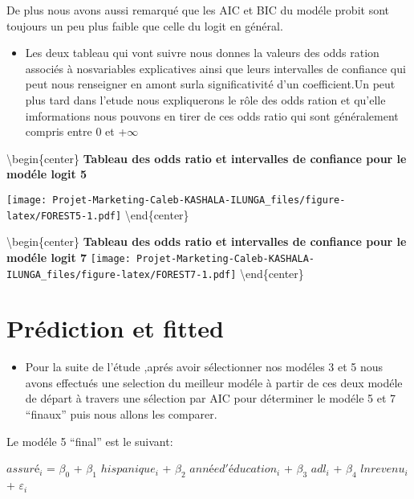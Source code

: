 \documentclass[
  14pt,
  french,
]{article}
\providecommand{\tightlist}{%
  \setlength{\itemsep}{0pt}\setlength{\parskip}{0pt}}
\begin{document}
De plus nous avons aussi remarqué que les AIC et BIC du modéle probit
sont toujours un peu plus faible que celle du logit en général.

\begin{itemize}
\tightlist
\item
  Les deux tableau qui vont suivre nous donnes la valeurs des odds
  ration associés à nosvariables explicatives ainsi que leurs
  intervalles de confiance qui peut nous renseigner en amont surla
  significativité d'un coefficient.Un peut plus tard dans l'etude nous
  expliquerons le rôle des odds ration et qu'elle imformations nous
  pouvons en tirer de ces odds ratio qui sont généralement compris entre
  0 et +\(\infty\)
\end{itemize}

\textbackslash begin\{center\} \textbf{Tableau des odds ratio et
intervalles de confiance pour le modéle logit 5}

\texttt{[image: Projet-Marketing-Caleb-KASHALA-ILUNGA\_files/figure-latex/FOREST5-1.pdf]}
\textbackslash end\{center\}

\textbackslash begin\{center\} \textbf{Tableau des odds ratio et
intervalles de confiance pour le modéle logit 7}
\texttt{[image: Projet-Marketing-Caleb-KASHALA-ILUNGA\_files/figure-latex/FOREST7-1.pdf]}
\textbackslash end\{center\}

\hypertarget{pruxe9diction-et-fitted}{%
\section{Prédiction et fitted}\label{pruxe9diction-et-fitted}}

\begin{itemize}
\tightlist
\item
  Pour la suite de l'étude ,aprés avoir sélectionner nos modéles 3 et 5
  nous avons effectués une selection du meilleur modéle à partir de ces
  deux modéle de départ à travers une sélection par AIC pour déterminer
  le modéle 5 et 7 ``finaux'' puis nous allons les comparer.
\end{itemize}

\linebreak

Le modéle 5 ``final'' est le suivant:

\begin{center}
$assuré_i$ = $\beta_0$  + $\beta_1$ $hispanique_i$ + $\beta_{2}$ $année d'éducation_i$ + $\beta_{3}$ $adl_i$ + $\beta_{4}$ $lnrevenu_i$+ $\varepsilon_i$ 
\end{center}
\end{document}

